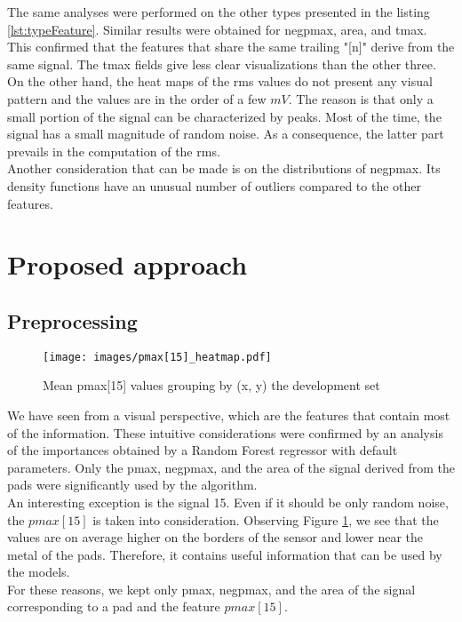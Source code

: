 \documentclass[conference]{IEEEtran}
\begin{document}
The same analyses were performed on the other types presented in the listing \ref{lst:typeFeature}. Similar results were obtained for negpmax, area, and tmax. This confirmed that the features that share the same trailing "[n]" derive from the same signal. The tmax fields give less clear visualizations than the other three. On the other hand, the heat maps of the rms values do not present any visual pattern and the values are in the order of a few $mV$. The reason is that only a small portion of the signal can be characterized by peaks. Most of the time, the signal has a small magnitude of random noise. As a consequence, the latter part prevails in the computation of the rms.\\

Another consideration that can be made is on the distributions of negpmax. Its density functions have an unusual number of outliers compared to the other features. 

\section{Proposed approach}
\subsection{Preprocessing}

\begin{figure}[htbp]
\centerline{\texttt{[image: images/pmax[15]\_heatmap.pdf]}}
\caption{Mean pmax[15] values grouping by (x, y) the development set}
\label{fig:pmax[15]_heatmap}
\end{figure}
We have seen from a visual perspective, which are the features that contain most of the information. These intuitive considerations were confirmed by an analysis of the importances obtained by a Random Forest regressor with default parameters. Only the pmax, negpmax, and the area of the signal derived from the pads were significantly used by the algorithm.\\ 
An interesting exception is the signal 15. Even if it should be only random noise, the $pmax[15]$ is taken into consideration. Observing Figure \ref{fig:pmax[15]_heatmap}, we see that the values are on average higher on the borders of the sensor and lower near the metal of the pads. Therefore, it contains useful information that can be used by the models. \\
For these reasons, we kept only pmax, negpmax, and the area of the signal corresponding to a pad and the feature $pmax[15]$.\\
\end{document}
